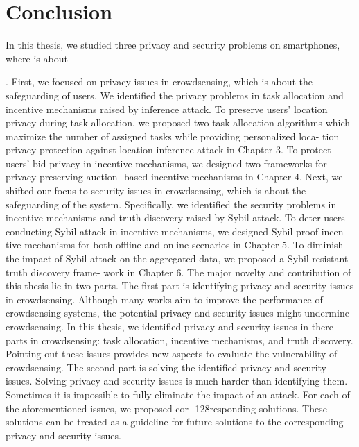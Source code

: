 \chapter{Conclusion}\label{chap:concl}

In this thesis, we studied three privacy and security problems on smartphones, where {\spp} is about  


. First, we focused on privacy issues in crowdsensing, which is about the safeguarding of users. We identified the privacy problems in task allocation and incentive mechanisms raised by inference attack. To preserve users’ location privacy during task allocation, we proposed two task allocation algorithms which maximize the number of assigned tasks while providing personalized loca- tion privacy protection against location-inference attack in Chapter 3. To protect users’ bid privacy in incentive mechanisms, we designed two frameworks for privacy-preserving auction- based incentive mechanisms in Chapter 4. Next, we shifted our focus to security issues in crowdsensing, which is about the safeguarding of the system. Specifically, we identified the security problems in incentive mechanisms and truth discovery raised by Sybil attack. To deter users conducting Sybil attack in incentive mechanisms, we designed Sybil-proof incen- tive mechanisms for both offline and online scenarios in Chapter 5. To diminish the impact of Sybil attack on the aggregated data, we proposed a Sybil-resistant truth discovery frame- work in Chapter 6. The major novelty and contribution of this thesis lie in two parts. The first part is identifying privacy and security issues in crowdsensing. Although many works aim to improve the performance of crowdsensing systems, the potential privacy and security issues might undermine crowdsensing. In this thesis, we identified privacy and security issues in there parts in crowdsensing: task allocation, incentive mechanisms, and truth discovery. Pointing out these issues provides new aspects to evaluate the vulnerability of crowdsensing. The second part is solving the identified privacy and security issues. Solving privacy and security issues is much harder than identifying them. Sometimes it is impossible to fully eliminate the impact of an attack. For each of the aforementioned issues, we proposed cor-
128responding solutions. These solutions can be treated as a guideline for future solutions to the corresponding privacy and security issues.

